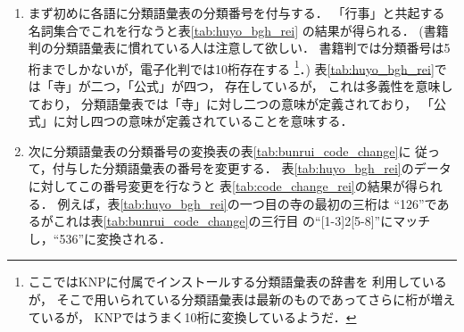 \begin{enumerate}
\item 
  まず初めに各語に分類語彙表の分類番号を付与する．
  「行事」と共起する名詞集合でこれを行なうと表\ref{tab:huyo_bgh_rei}
  の結果が得られる．
  (書籍判の分類語彙表に慣れている人は注意して欲しい．
  書籍判では分類番号は5桁までしかないが，電子化判では10桁存在する
  \footnote{
        ここではKNP\cite{KNP2.0b6}に付属でインストールする分類語彙表の辞書を
    利用しているが，
    そこで用いられている分類語彙表は最新のものであってさらに桁が増えているが，
    KNPではうまく10桁に変換しているようだ．}．)
  表\ref{tab:huyo_bgh_rei}では「寺」が二つ，「公式」が四つ，
  存在しているが，
  これは多義性を意味しており，
  分類語彙表では「寺」に対し二つの意味が定義されており，
  「公式」に対し四つの意味が定義されていることを意味する．
\item 
  \label{enum:change}
  次に分類語彙表の分類番号の変換表の表\ref{tab:bunrui_code_change}に
  従って，付与した分類語彙表の番号を変更する．
  表\ref{tab:huyo_bgh_rei}のデータに対してこの番号変更を行なうと
  表\ref{tab:code_change_rei}の結果が得られる．
  例えば，表\ref{tab:huyo_bgh_rei}の一つ目の寺の最初の三桁は
  ``126''であるがこれは表\ref{tab:bunrui_code_change}の三行目
  の``[1-3]2[5-8]''にマッチし，``536''に変換される．


\end{enumerate}
